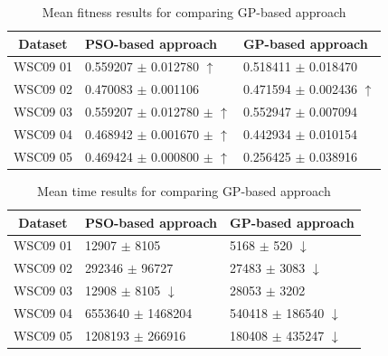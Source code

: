 \documentclass{IEEEtran}
\begin{document}
\begin{table}[]
\centering
\caption{Mean fitness results for comparing GP-based approach}
\label{meanFitness}
\begin{tabular}{l|l|l}
\hline
\multicolumn{1}{c|}{Dataset} & PSO-based approach & GP-based approach  \\ \hline
WSC09 01                     &0.559207 $\pm$ 0.012780 $\uparrow$      &0.518411 $\pm$ 0.018470               \\ \hline
WSC09 02                     &0.470083 $\pm$  0.001106   &0.471594 $\pm$  0.002436 $\uparrow$           \\ \hline
WSC09 03                     & 0.559207 $\pm$ 0.012780 $\pm$ $\uparrow$  &0.552947 $\pm$ 0.007094            \\ \hline
WSC09 04                     & 0.468942 $\pm$ 0.001670 $\pm$ $\uparrow$  &0.442934 $\pm$ 0.010154            \\ \hline
WSC09 05                     & 0.469424 $\pm$ 0.000800 $\pm$ $\uparrow$  &0.256425 $\pm$ 0.038916            \\ \hline
\end{tabular}
\end{table}


\begin{table}[]
\centering
\caption{Mean time results for comparing GP-based approach}
\label{meanTime}
\begin{tabular}{l|l|l}
\hline
\multicolumn{1}{c|}{Dataset} & PSO-based approach & GP-based approach  \\ \hline
WSC09 01                     &12907 $\pm$ 8105      &5168 $\pm$ 520 $\downarrow$                \\ \hline
WSC09 02                     &292346 $\pm$  96727    &27483 $\pm$  3083 $\downarrow$          \\ \hline
WSC09 03                     & 12908 $\pm$ 8105 $\downarrow$  &28053 $\pm$ 3202            \\ \hline
WSC09 04                     & 6553640 $\pm$ 1468204   &540418 $\pm$ 186540 $\downarrow$            \\ \hline
WSC09 05                     & 1208193 $\pm$ 266916   &180408 $\pm$ 435247 $\downarrow$           \\ \hline
\end{tabular}
\end{table}
\end{document}
